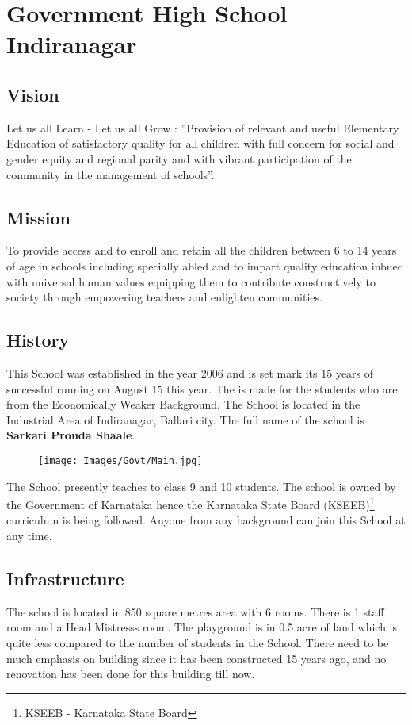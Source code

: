 \chapter{Government High School Indiranagar}
\section{Vision}
Let us all Learn - Let us all Grow :
''Provision of relevant and useful Elementary Education of satisfactory quality for all children with full concern for social and gender equity and regional parity and with vibrant participation of the community in the management of schools''.

\section{Mission}
To provide access and to enroll and retain all the children between 6 to 14 years of age in schools including specially abled and to impart quality education inbued with universal human values equipping them to contribute constructively to society through empowering teachers and enlighten communities.

\section{History}
This School was established in the year 2006 and is set mark its 15 years of successful running on August 15 this year. The is made for the students who are from the Economically Weaker Background. The School is located in the Industrial Area of Indiranagar,  Ballari city. The full name of the school is \textbf{Sarkari Prouda Shaale}.\\

\begin{figure}[H]
    \centering
    \texttt{[image: Images/Govt/Main.jpg]}
\end{figure}

The School presently teaches to class 9 and 10 students. The school is owned by the Government of Karnataka hence the Karnataka State Board (KSEEB)\footnote{KSEEB - Karnataka State Board} curriculum is being followed. Anyone from any background can join this School at any time.\\

\section{Infrastructure}
The school is located in 850 square metres area with 6 rooms. There is 1 staff room and a Head Mistresss room. The playground is in 0.5 acre of land which is quite less compared to the number of students in the School. There need to be much emphasis on building since it has been constructed 15 years ago, and no renovation has been done for this building till now. \\ 

